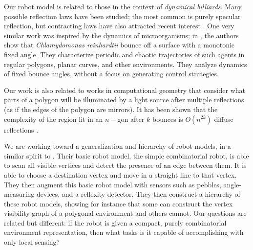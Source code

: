 \documentclass[]{styles/svproc}  %
\begin{document}

Our robot model is related to those in the context of \emph{dynamical billiards}. Many 
possible reflection laws have been studied;
the most common is purely specular reflection, but contracting laws have
also attracted recent interest \cite{DelMagno2014,billiards,pinball}. 
One very similar work was inspired by the dynamics of microorganisms; in \cite{microorganism2017}, 
the authors show that 
\textit{Chlamydomonas reinhardtii} bounce off a surface with a
monotonic fixed angle. They characterize periodic and
chaotic trajectories of such agents in regular polygons, planar curves, and other environments.
They analyze dynamics of fixed bounce angles, without a focus on generating control
strategies.

Our work is also related to works in computational geometry that consider what
parts of a polygon will be illuminated by a light source after multiple
reflections (as if the edges of the polygon are mirrors). It has been shown that
the complexity of the region lit in an $n-$gon after $k$ bounces is $O(n^{2k})$
{\color{red} diffuse reflections} \cite{Aronov1996,prasad1998visibility}.

We are working toward a generalization and hierarchy of robot models, in a
similar spirit to \cite{brunner2008simple}. Their basic robot model, the simple
combinatorial robot, is able to scan all visible vertices and detect the
presence of an edge between them. It is able to choose a destination vertex and
move in a straight line to that vertex. They then augment this basic robot model
with sensors such as pebbles, angle-measuring devices, and a reflexity detector.
They then construct a hierarchy of these robot models, showing for instance that
some can construct the vertex visibility graph of a polygonal environment
and others cannot. Our questions are related but different: if the robot is
given a compact, purely combinatorial environment representation, then what tasks is 
it capable of accomplishing with only local sensing?
\end{document}

